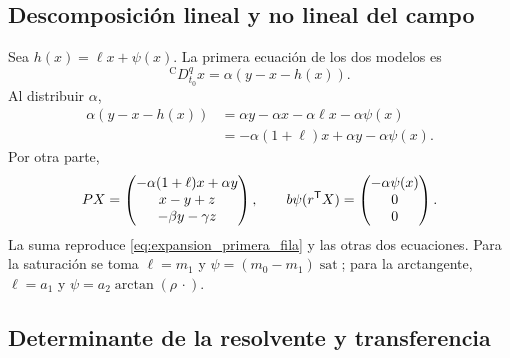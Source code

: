 \ifnum{}\relax
\subsection{Descomposición lineal y no lineal del campo}
\label{app:verificacion_lure}

Sea \(h(x)=\ell x+\psi(x)\). La primera ecuación de los dos modelos es
\[
{}^{\mathrm C}D_{t_0}^{q}x
=\alpha(y-x-h(x)).
\]
Al distribuir \(\alpha\),
\begin{align}
\alpha(y-x-h(x))
&=\alpha y-\alpha x-\alpha\ell x-\alpha\psi(x)\nonumber\\
&=-\alpha(1+\ell)x+\alpha y-\alpha\psi(x).
\label{eq:expansion_primera_fila}
\end{align}
Por otra parte,
\[
PX=
\begin{pmatrix}
-\alpha(1+\ell)x+\alpha y\\
x-y+z\\
-\beta y-\gamma z
\end{pmatrix},
\qquad
b\psi(r^{\mathsf T}X)=
\begin{pmatrix}
-\alpha\psi(x)\\0\\0
\end{pmatrix}.
\]
La suma reproduce \cref{eq:expansion_primera_fila} y las otras dos
ecuaciones. Para la saturación se toma
\(\ell=m_1\) y
\(\psi=(m_0-m_1)\operatorname{sat}\); para la arctangente,
\(\ell=a_1\) y \(\psi=a_2\arctan(\rho\,\cdot)\).

\fi
\ifnum{}\relax
\subsection{Determinante de la resolvente y transferencia}
\label{app:transferencia_explicita}

